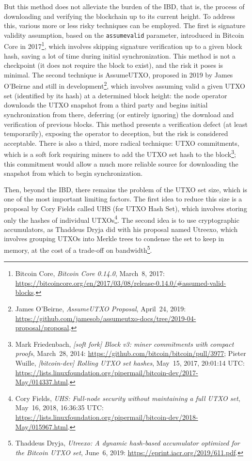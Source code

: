 \documentclass[
  a5paper,
  smalldemyvopaper,10pt,twoside,onecolumn,openright,extrafontsizes,hidelinks]{memoir}
\begin{document}
But this method does not alleviate the burden of the IBD, that is, the
process of downloading and verifying the blockchain up to its current
height. To address this, various more or less risky techniques can be
employed. The first is signature validity assumption, based on the
\texttt{assumevalid} parameter, introduced in Bitcoin Core in
2017\footnote{Bitcoin Core, \emph{Bitcoin Core 0.14.0}, March~8, 2017:
  \url{https://bitcoincore.org/en/2017/03/08/release-0.14.0/\#assumed-valid-blocks}.},
which involves skipping signature verification up to a given block hash,
saving a lot of time during initial synchronization. This method is not
a checkpoint (it does not require the block to exist), and the risk it
poses is minimal. The second technique is AssumeUTXO, proposed in 2019
by James O'Beirne and still in development\footnote{James O'Beirne,
  \emph{AssumeUTXO Proposal}, April~24, 2019:
  \url{https://github.com/jamesob/assumeutxo-docs/tree/2019-04-proposal/proposal}.},
which involves assuming valid a given UTXO set (identified by its hash)
at a determined block height: the node operator downloads the UTXO
snapshot from a third party and begins initial synchronization from
there, deferring (or entirely ignoring) the download and verification of
previous blocks. This method presents a verification defect (at least
temporarily), exposing the operator to deception, but the risk is
considered acceptable. There is also a third, more radical technique:
UTXO commitments, which is a soft fork requiring miners to add the UTXO
set hash to the block\footnote{Mark Friedenbach, \emph{{[}soft fork{]}
  Block v3: miner commitments with compact proofs}, March~28, 2014:
  \url{https://github.com/bitcoin/bitcoin/pull/3977}; Pieter Wuille,
  \emph{{[}bitcoin-dev{]} Rolling UTXO set hashes}, May~15, 2017,
  20:01:14 UTC:
  \url{https://lists.linuxfoundation.org/pipermail/bitcoin-dev/2017-May/014337.html}.};
this commitment would allow a much more reliable source for downloading
the snapshot from which to begin synchronization.

Then, beyond the IBD, there remains the problem of the UTXO set size,
which is one of the most important limiting factors. The first idea to
reduce this size is a proposal by Cory Fields called UHS (for UTXO Hash
Set), which involves storing only the hashes of individual
UTXOs\footnote{Cory Fields, \emph{UHS: Full-node security without
  maintaining a full UTXO set}, May~16, 2018, 16:36:35 UTC:
  \url{https://lists.linuxfoundation.org/pipermail/bitcoin-dev/2018-May/015967.html}.}.
The second idea is to use cryptographic accumulators, as Thaddeus Dryja
did with his proposal named Utreexo, which involves grouping UTXOs into
Merkle trees to condense the set to keep in memory, at the cost of a
trade-off on bandwidth\footnote{Thaddeus Dryja, \emph{Utreexo: A dynamic
  hash-based accumulator optimized for the Bitcoin UTXO set}, June~6,
  2019: \url{https://eprint.iacr.org/2019/611.pdf}.}.
\end{document}
